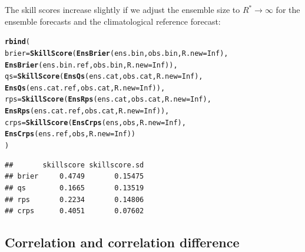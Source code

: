 \documentclass[article]{jss}\usepackage{graphicx, color}
\makeatletter
\newcommand{\hlfunctioncall}[1]{\textcolor[rgb]{0,0.501960784313725,0.752941176470588}{\textbf{#1}}}%
\newenvironment{kframe}{%
 \def\at@end@of@kframe{}%
 \ifinner\ifhmode%
  \def\at@end@of@kframe{\end{minipage}}%
  \begin{minipage}{\columnwidth}%
 \fi\fi%
 \def\FrameCommand##1{\hskip\@totalleftmargin \hskip-\fboxsep
 \colorbox{shadecolor}{##1}\hskip-\fboxsep
     \hskip-\linewidth \hskip-\@totalleftmargin \hskip\columnwidth}%
 \MakeFramed {\advance\hsize-\width
   \@totalleftmargin\z@ \linewidth\hsize
   \@setminipage}}%
 {\par\unskip\endMakeFramed%
 \at@end@of@kframe}
\newenvironment{knitrout}{}{} %
\makeatother
\begin{document}
The skill scores increase slightly if we adjust the ensemble size to $R^* \to \infty$ for the ensemble forecasts and the climatological reference forecast:

\begin{knitrout}
\color{fgcolor}\begin{kframe}
\begin{alltt}
\hlfunctioncall{rbind}(
  brier = \hlfunctioncall{SkillScore}(\hlfunctioncall{EnsBrier}(ens.bin, obs.bin, R.new=Inf), 
                     \hlfunctioncall{EnsBrier}(ens.bin.ref, obs.bin, R.new=Inf)),
  qs    = \hlfunctioncall{SkillScore}(\hlfunctioncall{EnsQs}(ens.cat, obs.cat, R.new=Inf), 
                     \hlfunctioncall{EnsQs}(ens.cat.ref, obs.cat, R.new=Inf)),
  rps   = \hlfunctioncall{SkillScore}(\hlfunctioncall{EnsRps}(ens.cat, obs.cat, R.new=Inf), 
                     \hlfunctioncall{EnsRps}(ens.cat.ref, obs.cat, R.new=Inf)),
  crps  = \hlfunctioncall{SkillScore}(\hlfunctioncall{EnsCrps}(ens, obs, R.new=Inf), 
                     \hlfunctioncall{EnsCrps}(ens.ref, obs, R.new=Inf))
)
\end{alltt}
\begin{verbatim}
##       skillscore skillscore.sd
## brier     0.4749       0.15475
## qs        0.1665       0.13519
## rps       0.2234       0.14806
## crps      0.4051       0.07602
\end{verbatim}
\end{kframe}
\end{knitrout}



\subsection{Correlation and correlation difference}
\end{document}
